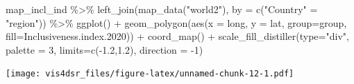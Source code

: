 \documentclass[
]{krantz}
\makeatletter
\newenvironment{Shaded}{\begin{snugshade}}{\end{snugshade}}
\newcommand{\AttributeTok}[1]{\textcolor[rgb]{0.61,0.61,0.61}{#1}}
\newcommand{\DecValTok}[1]{\textcolor[rgb]{0.06,0.06,0.06}{#1}}
\newcommand{\FloatTok}[1]{\textcolor[rgb]{0.06,0.06,0.06}{#1}}
\newcommand{\FunctionTok}[1]{\textcolor[rgb]{0,0,0}{#1}}
\newcommand{\NormalTok}[1]{#1}
\newcommand{\OtherTok}[1]{\textcolor[rgb]{0.37,0.37,0.37}{#1}}
\newcommand{\SpecialCharTok}[1]{\textcolor[rgb]{0,0,0}{#1}}
\newcommand{\StringTok}[1]{\textcolor[rgb]{0.5,0.5,0.5}{#1}}
\newenvironment{kframe}{%
\medskip{}
\setlength{\fboxsep}{.8em}
 \def\at@end@of@kframe{}%
 \ifinner\ifhmode%
  \def\at@end@of@kframe{\end{minipage}}%
  \begin{minipage}{\columnwidth}%
 \fi\fi%
 \def\FrameCommand##1{\hskip\@totalleftmargin \hskip-\fboxsep
 \colorbox{shadecolor}{##1}\hskip-\fboxsep
     \hskip-\linewidth \hskip-\@totalleftmargin \hskip\columnwidth}%
 \MakeFramed {\advance\hsize-\width
   \@totalleftmargin\z@ \linewidth\hsize
   \@setminipage}}%
 {\par\unskip\endMakeFramed%
 \at@end@of@kframe}
\renewenvironment{Shaded}{\begin{kframe}}{\end{kframe}}
\makeatother
\begin{document}
\begin{Shaded}
\begin{Highlighting}[]
\NormalTok{map\_incl\_ind }\SpecialCharTok{\%\textgreater{}\%}
  \FunctionTok{left\_join}\NormalTok{(}\FunctionTok{map\_data}\NormalTok{(}\StringTok{"world2"}\NormalTok{), }\AttributeTok{by =} \FunctionTok{c}\NormalTok{(}\StringTok{"Country"} \OtherTok{=} \StringTok{"region"}\NormalTok{)) }\SpecialCharTok{\%\textgreater{}\%}
  \FunctionTok{ggplot}\NormalTok{() }\SpecialCharTok{+} 
    \FunctionTok{geom\_polygon}\NormalTok{(}\FunctionTok{aes}\NormalTok{(}\AttributeTok{x =}\NormalTok{ long,}
                     \AttributeTok{y =}\NormalTok{ lat,}
                     \AttributeTok{group=}\NormalTok{group,}
                     \AttributeTok{fill=}\NormalTok{Inclusiveness.index}\FloatTok{.2020}\NormalTok{)) }\SpecialCharTok{+}
    \FunctionTok{coord\_map}\NormalTok{() }\SpecialCharTok{+}
    \FunctionTok{scale\_fill\_distiller}\NormalTok{(}\AttributeTok{type=}\StringTok{"div"}\NormalTok{, }\AttributeTok{palette =} \DecValTok{3}\NormalTok{, }
                         \AttributeTok{limits=}\FunctionTok{c}\NormalTok{(}\SpecialCharTok{{-}}\FloatTok{1.2}\NormalTok{,}\FloatTok{1.2}\NormalTok{), }
                         \AttributeTok{direction =} \SpecialCharTok{{-}}\DecValTok{1}\NormalTok{)}
\end{Highlighting}
\end{Shaded}

\texttt{[image: vis4dsr\_files/figure-latex/unnamed-chunk-12-1.pdf]}
\end{document}
